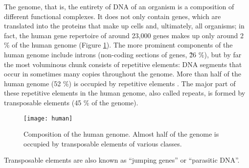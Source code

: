The genome, that is, the entirety of DNA of an organism is a composition
of different functional complexes. It does not only contain genes, which
are translated into the proteins that make up cells and, ultimately, all
organisms; in fact, the human gene repertoire of around 23,000 genes
makes up only around 2 \% of the human genome \citep{Makalowski2001}
(Figure \ref{fig:human-genome}). The more prominent components of the
human genome include introns (non-coding sections of genes, \~26 \%),
but by far the most voluminous chunk consists of repetitive elements:
DNA segments that occur in sometimes many copies throughout the genome.
More than half of the human genome (52 \%) is occupied by repetitive
elements \citep{Lander2001}.  The major part of these repetitive
elements in the human genome, also called repeats, is formed by
transposable elements (45 \% of the genome).

\begin{figure}
\centering
\texttt{[image: human]}
\caption{Composition of the human genome. Almost half of the genome is
occupied by transposable elements of various classes.}
\label{fig:human-genome}
\end{figure}

Transposable elements are also known as ``jumping genes'' or ``parasitic
DNA''. 
